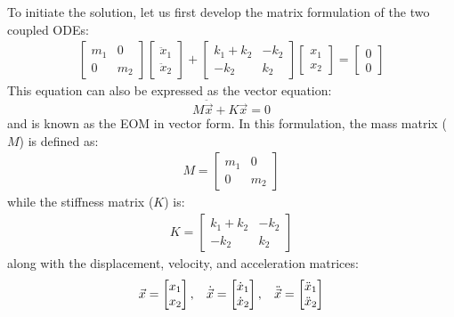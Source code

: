 \documentclass[12pt,letter]{article}
\begin{document}
To initiate the solution, let us first develop the matrix formulation of the two coupled ODEs:
\begin{eqnarray}
\begin{bmatrix} m_1 & 0  \\  0 & m_2 \end{bmatrix}\begin{bmatrix} \ddot{x}_1 \\  \ddot{x}_2 \end{bmatrix} + \begin{bmatrix} k_1+k_2 & -k_2  \\  -k_2 & k_2 \end{bmatrix}\begin{bmatrix} x_1 \\  x_2 \end{bmatrix} = \begin{bmatrix} 0 \\  0 \end{bmatrix}
\end{eqnarray}
This equation can also be expressed as the vector equation:
\begin{equation}
M\ddot{\vec{x}} + K\vec{x} =0
\end{equation}
and is known as the EOM in vector form. In this formulation, the mass matrix ($M$) is defined as:
\begin{eqnarray}
M=  \begin{bmatrix} m_1 & 0  \\  0 & m_2 \end{bmatrix}  
\end{eqnarray}
while the stiffness matrix ($K$) is:
\begin{eqnarray}
K=  \begin{bmatrix} k_1+k_2 & -k_2  \\  -k_2 & k_2 \end{bmatrix}
\end{eqnarray}
along with the displacement, velocity, and acceleration matrices:
\begin{eqnarray}
\vec{x}=  \begin{bmatrix} x_1 \\  x_2 \end{bmatrix} , \hspace{2ex} \dot{\vec{x}}=  \begin{bmatrix} \dot{x}_1 \\  \dot{x}_2 \end{bmatrix}, \hspace{2ex} \ddot{\vec{x}}=  \begin{bmatrix} \ddot{x}_1 \\  \ddot{x}_2 \end{bmatrix}
\end{eqnarray}
\end{document}
